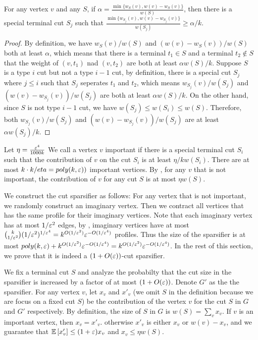 \begin{lemma} \label{lem:contribution}
    For any vertex $v$ and any $S$, if $\alpha = \frac{\min \{w_S(v),w(v)-w_S(v)\}}{w(S)}$, then there is a special terminal cut $S_j$ such that $\frac{\min \{w_{S_j}(v),w(v)-w_{S_j}(v)\}}{w(S_j)} \ge \alpha/k$.
\end{lemma}

\begin{proof}
    By definition, we have $w_S(v)/w(S)$ and $(w(v)-w_S(v))/w(S)$ both at least $\alpha$, which means that there is a terminal $t_1 \in S$ and a terminal $t_2 \notin S$ that the weight of $(v,t_1)$ nad $(v,t_2)$ are both at least $\alpha w(S)/k$. Suppose $S$ is a type $i$ cut but not a type $i-1$ cut, by definition, there is a special cut $S_j$ where $j \le i$ such that $S_j$ seperates $t_1$ and $t_2$, which means $w_{S_j}(v)/w(S_j)$ and $(w(v)-w_{S_j}(v))/w(S_j)$ are both at least $\alpha w(S)/k$. On the other hand, since $S$ is not type $i-1$ cut, we have $w(S_j) \le w(S_i) \le w(S)$. Therefore, both $w_{S_j}(v)/w(S_j)$ and $(w(v)-w_{S_j}(v))/w(S_j)$ are at least $\alpha w(S_j)/k$.
\end{proof}

Let $\eta = \frac{{\varepsilon}^4}{1000k}$ We call a vertex $v$ important if there is a special terminal cut $S_i$ such that the contribution of $v$ on the cut $S_i$ is at least $\eta/k w(S_i)$. There are at most $k \cdot k/eta  = poly(k,{\varepsilon}))$ important vertices. By , for any $v$ that is not important, the contribution of $v$ for any cut $S$ is at most $\eta w(S)$. 

We construct the cut sparsifier as follows: For any vertex that is not important, we randomly construct an imaginary vertex. Then we contract all vertices that has the same profile for their imaginary vertices. Note that each imaginary vertex has at most $1/{\varepsilon}^2$ edges, by , imaginary vertices have at most $\binom{k}{1/{\varepsilon}^2} (1/{\varepsilon}^2)^{1/{\varepsilon}^4} = k^{O(1/{\varepsilon}^2)}{\varepsilon}^{-O(1/{\varepsilon}^4)}$ profiles. Thus the size of the sparsifier is at most $poly(k,{\varepsilon}) + k^{O(1/{\varepsilon}^2)}{\varepsilon}^{-O(1/{\varepsilon}^4)} = k^{O(1/{\varepsilon}^2)}{\varepsilon}^{-O(1/{\varepsilon}^4)}$. In the rest of this section, we prove that it is indeed a $(1+O({\varepsilon}))$-cut sparsifier.

We fix a terminal cut $S$ and analyze the probabilty that the cut size in the sparsifier is increased by a factor of at most $(1+O({\varepsilon}))$. Denote $G'$ as the the sparsifier. For any vertex $v$, let $x_v$ and $x'_v$ (we omit $S$ in the definition because we are focus on a fixed cut $S$) be the contribution of the vertex $v$ for the cut $S$ in $G$ and $G'$ respectively. By definition, the size of $S$ in $G$ is $w(S) = \sum_v x_v$. If $v$ is an important vertex, then $x_v = x'_v$. otherwise $x'_v$ is either $x_v$ or $w(v)-x_v$, and we guarantee that ${\mathbb{E}}\left[ x'_v \right] \le (1+{\varepsilon})x_v$ and $x_v \le \eta w(S)$.

